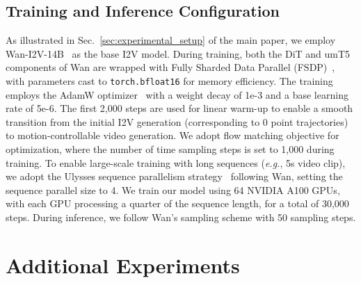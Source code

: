 \documentclass{article}
\newcommand{\eg}{\textit{e.g.}}
\begin{document}
\subsection{Training and Inference Configuration}
\label{subsec:supp_configuration}

As illustrated in Sec.~\ref{sec:experimental_setup} of the main paper, we employ Wan-I2V-14B~\cite{wan} as the base I2V model.
During training, both the DiT and umT5 components of Wan are wrapped with Fully Sharded Data Parallel (FSDP)~\cite{pytorch-fsdp}, with parameters cast to \texttt{torch.bfloat16} for memory efficiency. The training employs the AdamW optimizer~\cite{kingma2017adam} with a weight decay of 1e-3 and a base learning rate of 5e-6. The first 2,000 steps are used for linear warm-up to enable a smooth transition from the initial I2V generation (corresponding to 0 point trajectories) to motion-controllable video generation. We adopt flow matching objective for optimization, where the number of time sampling steps is set to 1,000 during training.
To enable large-scale training with long sequences (\eg, 5s video clip), we adopt the Ulysses sequence parallelism strategy~\cite{jacobs2023deepspeed} following Wan, setting the sequence parallel size to 4. We train our model using 64 NVIDIA A100 GPUs, with each GPU processing a quarter of the sequence length, for a total of 30,000 steps.
During inference, we follow Wan’s sampling scheme with 50 sampling steps.


\section{Additional Experiments}
\label{sec:supp_exp}
\end{document}
